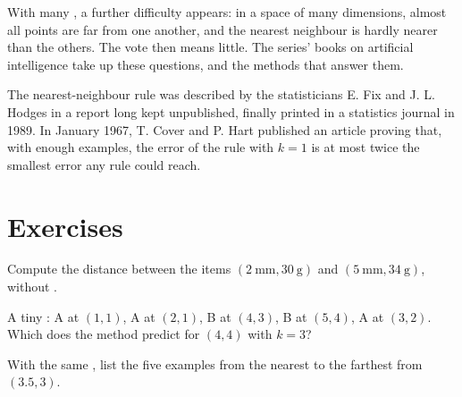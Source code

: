 \begin{remark}
With many , a further difficulty appears: in a space of many dimensions, almost all points are far from one
another, and the nearest neighbour is hardly nearer than the others. The vote then means little. The series' books on
artificial intelligence take up these questions, and the methods that answer them.
\end{remark}

\begin{history}[Neighbours]
The nearest-neighbour rule was described by the statisticians E. Fix and J. L. Hodges in a report long kept unpublished,
finally printed in a statistics journal in 1989. In January 1967, T. Cover and P. Hart published an article proving
that, with enough examples, the error of the rule with $k = 1$ is at most twice the smallest error any rule could
reach.
\end{history}

\section{Exercises}\label{sec:g11:k-nearest-neighbours:exercises}

\begin{exercise}[$\star$]\label{exo:g11:k-nearest-neighbours:1}
Compute the distance between the items $(2~\text{mm}, 30~\text{g})$ and $(5~\text{mm}, 34~\text{g})$, without
.
\end{exercise}

\begin{exercise}[$\star$]\label{exo:g11:k-nearest-neighbours:2}
A tiny : A at $(1, 1)$, A at $(2, 1)$, B at $(4, 3)$, B at $(5, 4)$, A at $(3, 2)$. Which  does the
method predict for $(4, 4)$ with $k = 3$?
\end{exercise}

\begin{exercise}[$\star$]\label{exo:g11:k-nearest-neighbours:3}
With the same , list the five examples from the nearest to the farthest from $(3.5, 3)$.
\end{exercise}

